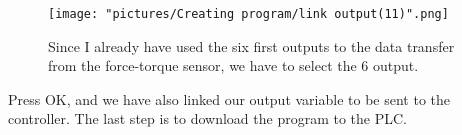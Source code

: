 \documentclass{article}
\begin{document}
\begin{figure}[h!]
    \centering
    \texttt{[image: "pictures/Creating program/link output(11)".png]}
    \caption{Since I already have used the six first outputs to the data transfer from the force-torque sensor, we have to select the 6 output.}
    \label{fig:my_label}
\end{figure}

Press OK, and we have also linked our output variable to be sent to the controller. The last step is to download the program to the PLC.
\end{document}
